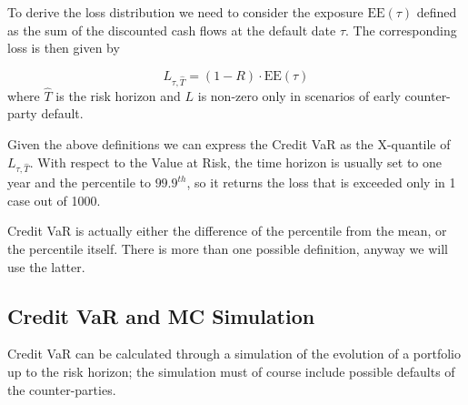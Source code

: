 To derive the loss distribution we need to consider the exposure $\textrm{EE}(\tau)$ defined as the sum of the discounted cash flows at the default date $\tau$. The corresponding loss is then given by

\begin{equation}
L_{\tau, \hat{T}} = (1 - R) \cdot \textrm{EE}(\tau)
\end{equation}
where \(\hat{T}\) is the risk horizon and $L$ is non-zero only in scenarios of early counter-party default. 

Given the above definitions we can express the Credit VaR as the X-quantile of $L_{\tau, \hat{T}}$.
With respect to the Value at Risk, the time horizon is usually set to one year and the percentile to $99.9^{th}$, so it returns the loss that is exceeded only in 1 case out of 1000. 

Credit VaR is actually either the difference of the percentile from the mean, or the percentile itself. There is more than one possible definition, anyway we  will use the latter.

%

\subsection{Credit VaR and MC Simulation}

Credit VaR can be calculated through a simulation of the evolution of a portfolio up to the risk horizon; the simulation must of course include possible defaults of the counter-parties. 

